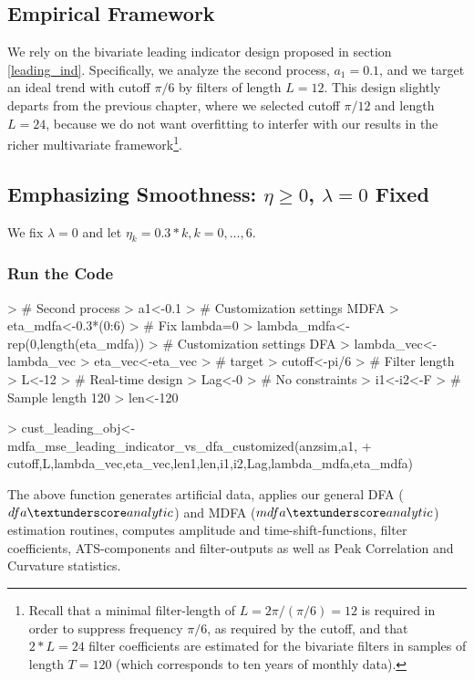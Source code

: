 \documentclass[a4paper]{book}
\begin{document}
\subsection{Empirical Framework}

We rely on the bivariate leading indicator design proposed in section \ref{leading_ind}. Specifically, we analyze the second process, $a_1=0.1$, and we target an ideal trend with cutoff $\pi/6$ by filters of length $L=12$. This design slightly departs from the previous chapter, where we selected cutoff $\pi/12$ and length $L=24$, because we do not want overfitting to interfer with our results in the richer multivariate framework\footnote{Recall that a minimal filter-length of $L=2\pi/(\pi/6)=12$ is required in order to suppress frequency $\pi/6$, as required by the cutoff, and that $2*L=24$ filter coefficients are estimated for the bivariate filters in samples of length $T=120$ (which corresponds to ten years of monthly data).}. 





\subsection{Emphasizing Smoothness: $\eta\geq 0$, $\lambda=0$ Fixed}\label{e_s_mdfa}

We fix $\lambda=0$ and let $\eta_k=0.3*k, k=0,...,6$.

\subsubsection{Run the Code}


\begin{Schunk}
\begin{Sinput}
> # Second process
> a1<-0.1
> # Customization settings MDFA
> eta_mdfa<-0.3*(0:6)
> # Fix lambda=0
> lambda_mdfa<-rep(0,length(eta_mdfa))
> # Customization settings DFA
> lambda_vec<-lambda_vec
> eta_vec<-eta_vec
> # target
> cutoff<-pi/6
> # Filter length
> L<-12
> # Real-time design
> Lag<-0
> # No constraints
> i1<-i2<-F
> # Sample length 120
> len<-120
\end{Sinput}
\end{Schunk}
\begin{Schunk}
\begin{Sinput}
> cust_leading_obj<-mdfa_mse_leading_indicator_vs_dfa_customized(anzsim,a1,
+     cutoff,L,lambda_vec,eta_vec,len1,len,i1,i2,Lag,lambda_mdfa,eta_mdfa)  
\end{Sinput}
\end{Schunk}
The above function generates artificial data, applies our general DFA ($dfa\textunderscore analytic$) and MDFA ($mdfa\textunderscore analytic$) estimation routines, computes amplitude and time-shift-functions, filter coefficients, ATS-components and filter-outputs as well as Peak Correlation and Curvature statistics.
\end{document}
